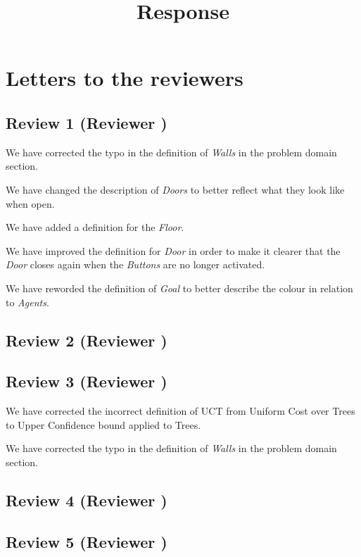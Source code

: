\documentclass{article}
\title{Response}
\begin{document}
\maketitle
\section{Letters to the reviewers}
\subsection{Review 1 (Reviewer )}
We have corrected the typo in the definition of \emph{Walls} in the problem domain section.

We have changed the description of \emph{Doors} to better reflect what they look like when open.

We have added a definition for the \emph{Floor}.

We have improved the definition for \emph{Door} in order to make it clearer that the \emph{Door} closes again when the \emph{Buttons} are no longer activated.

We have reworded the definition of \emph{Goal} to better describe the colour in relation to \emph{Agents}.
\subsection{Review 2 (Reviewer )}
\subsection{Review 3 (Reviewer )}
We have corrected the incorrect definition of UCT from Uniform Cost over Trees to Upper Confidence bound applied to Trees.

We have corrected the typo in the definition of \emph{Walls} in the problem domain section.
\subsection{Review 4 (Reviewer )}
\subsection{Review 5 (Reviewer )}
\end{document}
